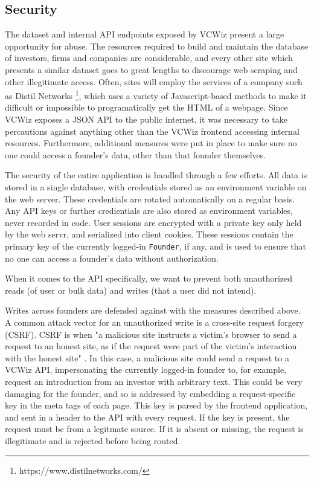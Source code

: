 \subsection{Security}

The dataset and internal API endpoints exposed by VCWiz present a large opportunity for abuse. The resources required to build and maintain the database of investors, firms and companies are considerable, and every other site which presents a similar dataset goes to great lengths to discourage web scraping and other illegitimate access. Often, sites will employ the services of a company such as Distil Networks \footnote{https://www.distilnetworks.com/}, which uses a variety of Javascript-based methods to make it difficult or impossible to programatically get the HTML of a webpage. Since VCWiz exposes a JSON API to the public internet, it was necessary to take percautions against anything other than the VCWiz frontend accessing internal resources. Furthermore, additional measures were put in place to make sure no one could access a founder's data, other than that founder themselves.

The security of the entire application is handled through a few efforts. All data is stored in a single database, with credentials stored as an environment variable on the web server. These credentials are rotated automatically on a regular basis. Any API keys or further credientials are also stored as environment variables, never recorded in code. User sessions are encrypted with a private key only held by the web servr, and serialized into client cookies. These sessions contain the primary key of the currently logged-in \texttt{Founder}, if any, and is used to ensure that no one can access a founder's data without authorization.

When it comes to the API specifically, we want to prevent both unauthorized reads (of user or bulk data) and writes (that a user did not intend).

Writes across founders are defended against with the measures described above. A common attack vector for an unauthorized write is a cross-site request forgery (CSRF). CSRF is when "a malicious site instructs a victim’s browser to send a request to an honest site, as if the request were part of the victim’s interaction with the honest site" \cite{Barth:2008:RDC:1455770.1455782}. In this case, a malicious site could send a request to a VCWiz API, impersonating the currently logged-in founder to, for example, request an introduction from an investor with arbitrary text. This could be very damaging for the founder, and so is addressed by embedding a request-specific key in the meta tags of each page. This key is parsed by the frontend application, and sent in a header to the API with every request. If the key is present, the request must be from a legitmate source. If it is absent or missing, the request is illegitimate and is rejected before being routed.

